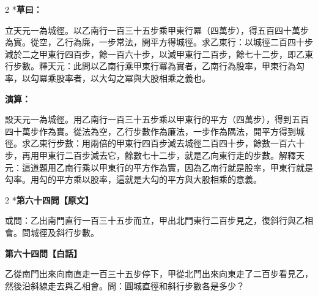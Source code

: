 \documentclass[11pt,a4paper]{article}
\begin{document}
\begin{paracol}{2}
\switchcolumn[0]*\textbf{草曰：}

\small 立天元一為城徑。以乙南行一百三十五步乘甲東行冪（四萬步），得五百四十萬步為實。從空，乙行為廉，一步常法，開平方得城徑。求乙東行：以城徑二百四十步減於二之甲東行四百步，餘一百六十步，以減甲東行二百步，餘七十二步，即乙東行步數。釋天元：此問以乙南行乘甲東行冪為實者，乙南行為股率，甲東行為勾率，以勾冪乘股率者，以大勾之冪與大股相乘之義也。

\switchcolumn\textbf{演算：}

\small 設天元一為城徑。用乙南行一百三十五步乘以甲東行的平方（四萬步），得到五百四十萬步作為實。從法為空，乙行步數作為廉法，一步作為隅法，開平方得到城徑。求乙東行步數：用兩倍的甲東行四百步減去城徑二百四十步，餘數一百六十步，再用甲東行二百步減去它，餘數七十二步，就是乙向東行走的步數。解釋天元：這道題用乙南行乘以甲東行的平方作為實，因為乙南行就是股率，甲東行就是勾率。用勾的平方乘以股率，這就是大勾的平方與大股相乘的意義。
\end{paracol}

\vspace{0.1cm}
\noindent{}
\par\vspace{0.3cm}

\begin{paracol}{2}
\switchcolumn[0]*\noindent\textbf{第六十四問【原文】}

\small 或問：乙出南門直行一百三十五步而立，甲出北門東行二百步見之，復斜行與乙相會。問城徑及斜行步數。

\switchcolumn\noindent\textbf{第六十四問【白話】}

\small 乙從南門出來向南直走一百三十五步停下，甲從北門出來向東走了二百步看見乙，然後沿斜線走去與乙相會。問：圓城直徑和斜行步數各是多少？
\end{paracol}

\vspace{0.1cm}
\noindent{}
\par\vspace{0.15cm}
\end{document}
